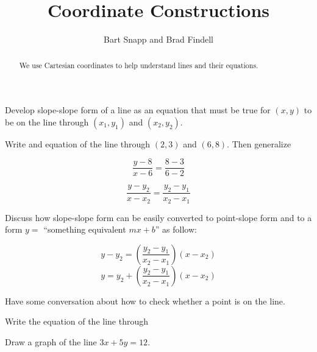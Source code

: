 \documentclass[nooutcomes,instructornotes]{ximera}
\title{Coordinate Constructions}
\author{Bart Snapp and Brad Findell}
\begin{document}
\begin{abstract}
  We use Cartesian coordinates to help understand lines and their equations.
\end{abstract}
\maketitle


%
%
%
%
%
%




\begin{problem}


Develop slope-slope form of a line as an equation that must be true for $(x,y)$ to be on the line through $(x_1,y_1)$ and $(x_2,y_2)$.  

Write and equation of the line through $(2,3)$ and $(6,8)$.  Then generalize

\[
\frac{y-8}{x-6} = \frac{8-3}{6-2}
\]

\[
\frac{y-y_2}{x-x_2} = \frac{y_2-y_1}{x_2-x_1}
\]


Discuss how slope-slope form can be easily converted to point-slope form and to a form $y =$ ``something equivalent $mx + b$'' as follow: 

\[
y-y_2 =\left(\frac{y_2-y_1}{x_2-x_1}\right) (x-x_2)
\]
\[
y =y_2 + \left(\frac{y_2-y_1}{x_2-x_1}\right) (x-x_2)
\]

Have some conversation about how to check whether a point is on the line.  

Write the equation of the line through

\end{problem}

\begin{problem}
Draw a graph of the line $3x+5y=12$.  
\end{problem}
\end{document}
